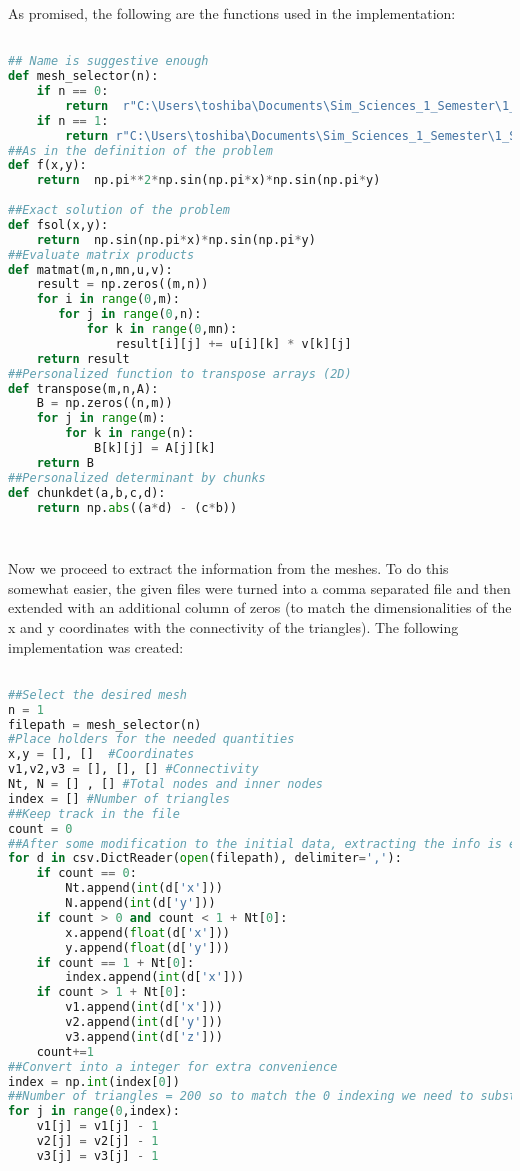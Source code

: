 \documentclass[a4paper, 11pt, oneside]{scrartcl}
\begin{document}
{As promised, the following are the functions used in the implementation:
 \begin{center}
\begin{lstlisting}[language=Python, caption={Pyhton, Function definition },frame=single,breaklines=true]

## Name is suggestive enough
def mesh_selector(n):
    if n == 0:
        return  r"C:\Users\toshiba\Documents\Sim_Sciences_1_Semester\1_Sem_Materias\NMPDE\HW8\str10_test.csv"
    if n == 1:
        return r"C:\Users\toshiba\Documents\Sim_Sciences_1_Semester\1_Sem_Materias\NMPDE\HW8\unstr8_test.csv"
##As in the definition of the problem
def f(x,y):
    return  np.pi**2*np.sin(np.pi*x)*np.sin(np.pi*y)
    
##Exact solution of the problem
def fsol(x,y):
    return  np.sin(np.pi*x)*np.sin(np.pi*y)
##Evaluate matrix products
def matmat(m,n,mn,u,v):
    result = np.zeros((m,n))
    for i in range(0,m):
       for j in range(0,n):
           for k in range(0,mn):
               result[i][j] += u[i][k] * v[k][j]
    return result
##Personalized function to transpose arrays (2D)
def transpose(m,n,A):
    B = np.zeros((n,m))
    for j in range(m):
        for k in range(n):
            B[k][j] = A[j][k]
    return B
##Personalized determinant by chunks
def chunkdet(a,b,c,d):
    return np.abs((a*d) - (c*b))
    
       
\end{lstlisting}


Now we proceed to extract the information from the meshes. To do this somewhat easier, the given files were turned into a comma separated file and then extended with an additional column of zeros (to match the dimensionalities of the x and y coordinates with the connectivity of the triangles). The following implementation was created:


\begin{center}
\begin{lstlisting}[language=Python, caption={Pyhton, Information extraction },frame=single,breaklines=true]

##Select the desired mesh
n = 1
filepath = mesh_selector(n)
#Place holders for the needed quantities
x,y = [], []  #Coordinates
v1,v2,v3 = [], [], [] #Connectivity
Nt, N = [] , [] #Total nodes and inner nodes
index = [] #Number of triangles
##Keep track in the file
count = 0
##After some modification to the initial data, extracting the info is easier now
for d in csv.DictReader(open(filepath), delimiter=','):
    if count == 0:
        Nt.append(int(d['x']))
        N.append(int(d['y']))
    if count > 0 and count < 1 + Nt[0]:
        x.append(float(d['x']))
        y.append(float(d['y']))
    if count == 1 + Nt[0]:
        index.append(int(d['x']))
    if count > 1 + Nt[0]:
        v1.append(int(d['x']))
        v2.append(int(d['y']))
        v3.append(int(d['z']))
    count+=1
##Convert into a integer for extra convenience
index = np.int(index[0])
##Number of triangles = 200 so to match the 0 indexing we need to substract 1
for j in range(0,index):
    v1[j] = v1[j] - 1
    v2[j] = v2[j] - 1
    v3[j] = v3[j] - 1
       

\end{lstlisting}
\end{center}
\end{center}}
\end{document}
